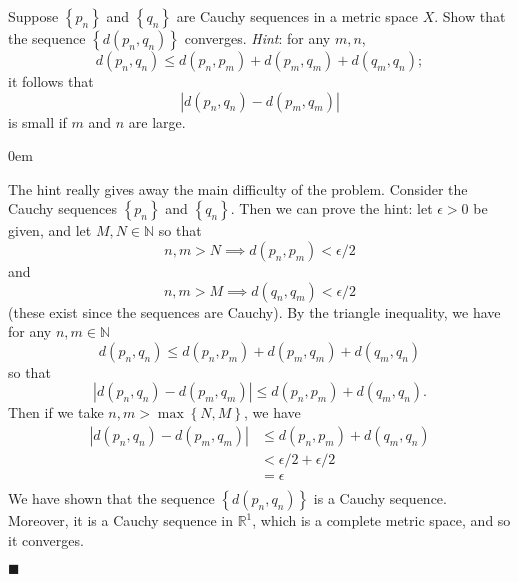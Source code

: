 \documentclass[12pt]{article}
\renewcommand{\qed}{\hfill$\blacksquare$}
\renewenvironment{proof}{\begin{addmargin}[1em]{0em}\begin{newproof}}{\end{newproof}\end{addmargin}\qed}
\newenvironment{problem}[2][Exercise]{\begin{trivlist}
\item[\hskip \labelsep {\bfseries #1}\hskip \labelsep {\bfseries #2.}]}{\end{trivlist}}
\begin{document}
\begin{problem}{3.23}
Suppose $\left\{p_n\right\}$ and $\left\{q_n\right\}$ are Cauchy sequences in a metric space $X$. Show that the sequence $\left\{d\left(p_n,q_n\right)\right\}$ converges. \textit{Hint}: for any $m,n$, $$ d\left(p_n,q_n\right) \leq d\left(p_n,p_m\right) + d\left(p_m,q_m\right) + d\left(q_m,q_n\right);$$ it follows that $$ \left| d\left(p_n,q_n\right) - d\left(p_m,q_m\right)\right|$$ is small if $m$ and $n$ are large.
\end{problem}
\begin{proof}
The hint really gives away the main difficulty of the problem. Consider the Cauchy sequences $\left\{p_n\right\}$ and $\left\{q_n\right\}$. Then we can prove the hint: let $\epsilon>0$ be given, and let $M,N\in \mathbb{N}$ so that $$ n,m>N \implies d\left(p_n,p_m\right) < \epsilon/2 $$ and $$ n,m>M \implies d\left(q_n,q_m\right) < \epsilon/2 $$ (these exist since the sequences are Cauchy). By the triangle inequality, we have for any $n,m\in \mathbb{N}$ $$ d\left(p_n,q_n\right) \leq d\left(p_n,p_m\right) + d\left(p_m, q_m\right) + d\left(q_m,q_n\right) $$ so that $$ \left| d\left(p_n,q_n\right)-d\left(p_m, q_m\right) \right| \leq d\left(p_n,p_m\right) + d\left(q_m,q_n\right).$$ Then if we take $n,m > \max \left\{N,M\right\}$, we have \begin{align*}
\left|d\left(p_n,q_n\right) - d\left(p_m,q_m\right) \right| & \leq d\left(p_n,p_m\right) + d\left(q_m,q_n\right) \\
& < \epsilon/2  + \epsilon/2 \\
& = \epsilon\\
\end{align*} 
We have shown that the sequence $\left\{d\left(p_n,q_n\right)\right\}$ is a Cauchy sequence. Moreover, it is a Cauchy sequence in $\mathbb{R}^1$, which is a complete metric space, and so it converges.
\end{proof}
\end{document}
